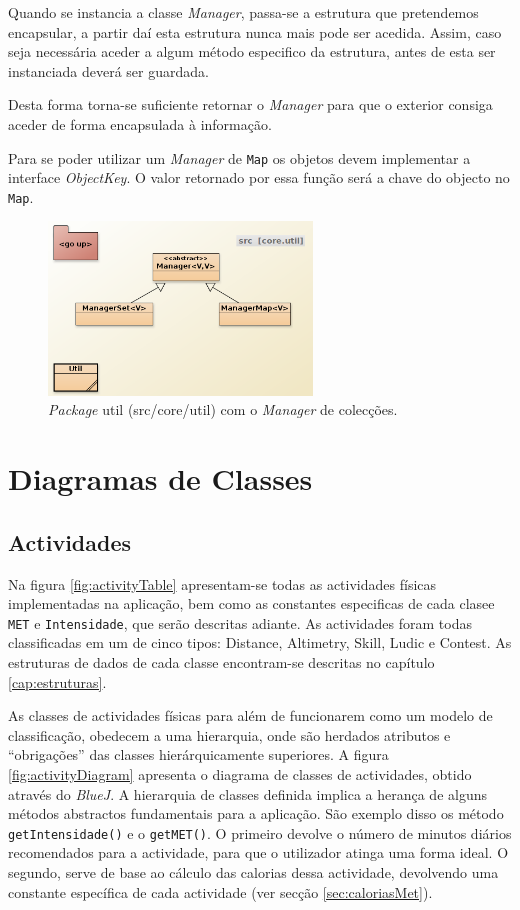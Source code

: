 \documentclass[a4paper,10pt]{report}
\begin{document}
Quando se instancia a classe \emph{Manager}, passa-se a estrutura que pretendemos encapsular, a partir daí esta estrutura nunca mais 
pode ser acedida. Assim, caso seja necessária aceder a algum método especifico da estrutura, antes de esta ser instanciada deverá ser guardada.

Desta forma torna-se suficiente retornar o \emph{Manager} para que o exterior consiga aceder de forma encapsulada à informação.

Para se poder utilizar um \emph{Manager} de \verb!Map! os objetos devem implementar a interface \emph{ObjectKey}. 
O valor retornado por essa função será a chave do objecto no \verb!Map!.

\begin{figure}
\centering
\includegraphics[width=7cm]{coreUtil.png}
\caption{\emph{Package} util (src/core/util) com o \emph{Manager} de colecções.}
\label{fig:manager}
\end{figure}

\section{Diagramas de Classes}
\label{sec:classes}
\subsection{Actividades}
\label{subsec:actividadesDiagrama}
Na figura \ref{fig:activityTable} apresentam-se todas as actividades físicas implementadas na aplicação, 
bem como as constantes especificas de cada clasee \verb!MET! e \verb!Intensidade!, que serão descritas adiante.
As actividades foram todas classificadas em um de cinco tipos: Distance, Altimetry, Skill, Ludic e Contest.
As estruturas de dados de cada classe encontram-se descritas no capítulo \ref{cap:estruturas}.

As classes de actividades físicas para além de funcionarem como um modelo de classificação, 
obedecem a uma hierarquia, onde são herdados atributos e ``obrigações'' das classes hierárquicamente superiores.
A figura \ref{fig:activityDiagram} apresenta o diagrama de classes de actividades, obtido através do \emph{BlueJ}.
A hierarquia de classes definida implica a herança de alguns métodos abstractos fundamentais para a aplicação.
São exemplo disso os método \verb!getIntensidade()! e o \verb!getMET()!.
O primeiro devolve o número de minutos diários recomendados para a actividade, para que o utilizador atinga uma forma ideal. 
O segundo, serve de base ao cálculo das calorias dessa actividade, devolvendo uma constante específica de cada actividade (ver secção \ref{sec:caloriasMet}).
\end{document}
